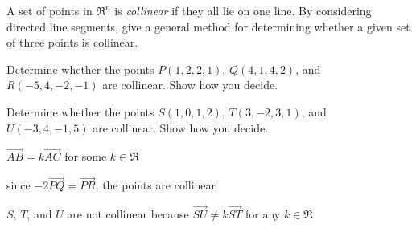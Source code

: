 
\begin{Exercise}[
name={},
title={}, 
difficulty=0,
origin={\cite{SM}}]
A set of points in $\Re^n$ is \emph{collinear} if they all lie on one line.
\Question By considering directed line segments, give a general method for determining whether a given set of three points is collinear.

\Question Determine whether the points $P(1,2,2,1)$, $Q(4,1,4,2)$, and $R(-5,4,-2,-1)$ are collinear. Show how you decide.

\Question Determine whether the points $S(1,0,1,2)$, $T(3,-2,3,1)$, and $U(-3,4,-1,5)$ are collinear. Show how you decide.
\end{Exercise}

\begin{Answer}
\Question $\overrightarrow{AB}=k\overrightarrow{AC}$ for some $k\in\Re$

\Question since $-2\overrightarrow{PQ}=\overrightarrow{PR}$, the points are collinear

\Question $S$, $T$, and $U$ are not collinear because $\overrightarrow{SU}\neq k\overrightarrow{ST}$ for any $k\in\Re$
\end{Answer}
